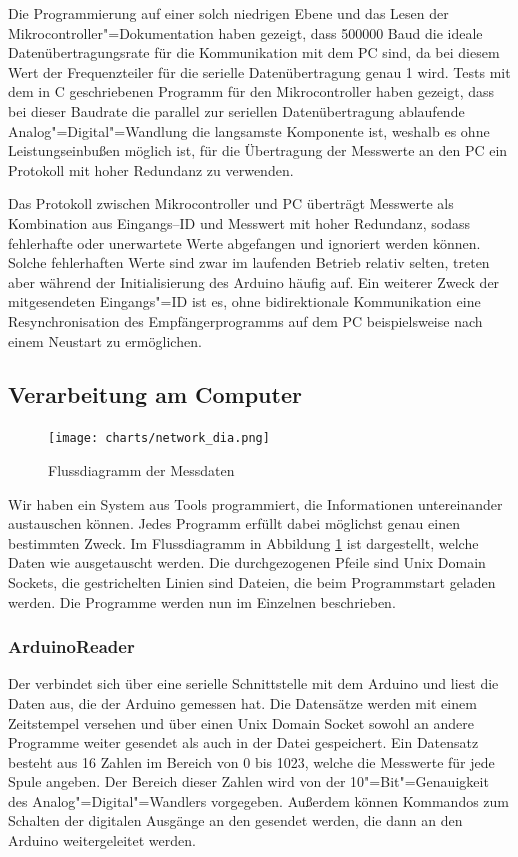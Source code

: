 Die Programmierung auf einer solch niedrigen Ebene und das Lesen der Mikrocontroller"=Dokumentation
haben gezeigt, dass 500000 Baud die ideale Datenübertragungsrate für die Kommunikation mit dem PC
sind, da bei diesem Wert der Frequenzteiler für die serielle Datenübertragung genau 1 wird.
Tests mit dem in C geschriebenen Programm für den Mikrocontroller haben gezeigt, dass bei
dieser Baudrate die
parallel zur seriellen Datenübertragung ablaufende Analog"=Digital"=Wandlung die langsamste
Komponente ist, weshalb es ohne Leistungseinbußen möglich ist, für die Übertragung
der Messwerte an den PC ein Protokoll mit hoher Redundanz zu verwenden.

Das Protokoll zwischen Mikrocontroller und PC überträgt Messwerte als Kombination aus
Eingangs--ID und Messwert mit hoher Redundanz, sodass fehlerhafte oder
unerwartete Werte abgefangen und
ignoriert werden können. Solche fehlerhaften Werte sind zwar im laufenden Betrieb relativ selten,
treten aber während der Initialisierung des Arduino häufig auf. Ein weiterer Zweck der
mitgesendeten Eingangs"=ID ist es, ohne bidirektionale Kommunikation eine Resynchronisation des
Empfängerprogramms auf dem PC beispielsweise nach einem Neustart zu ermöglichen.

\subsection{Verarbeitung am Computer}

\begin{figure}
  \centering
  \texttt{[image: charts/network\_dia.png]}
  \caption{Flussdiagramm der Messdaten}
  \label{fig:network}
\end{figure}

Wir haben ein System aus Tools programmiert, die Informationen untereinander austauschen können. Jedes Programm erfüllt dabei möglichst genau einen bestimmten Zweck.
Im Flussdiagramm in Abbildung \ref{fig:network} ist dargestellt, welche Daten wie ausgetauscht werden.
Die durchgezogenen Pfeile sind Unix Domain Sockets, die gestrichelten Linien sind Dateien, die beim Programmstart geladen werden.
Die Programme werden nun im Einzelnen beschrieben.

\subsubsection{ArduinoReader}

Der  verbindet sich über eine serielle Schnittstelle mit dem Arduino und liest die Daten aus, die der Arduino gemessen hat.
Die Datensätze werden mit einem Zeitstempel versehen und über einen Unix Domain Socket sowohl an andere Programme weiter gesendet als auch in der Datei  gespeichert.
Ein Datensatz besteht aus 16 Zahlen im Bereich von 0 bis 1023, welche die Messwerte für jede Spule angeben.
Der Bereich dieser Zahlen wird von der 10"=Bit"=Genauigkeit des Analog"=Digital"=Wandlers vorgegeben.
Außerdem können Kommandos zum Schalten der digitalen Ausgänge an den  gesendet werden, die dann an den Arduino weitergeleitet werden.

